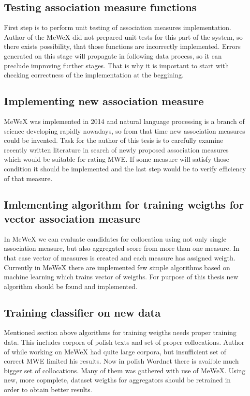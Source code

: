 \subsection{Testing association measure functions}
First step is to perform unit testing of association measures implementation. Author of the MeWeX did not prepared unit tests for this part of the system, 
so there exists possibility, that those functions are incorrectly implemented. Errors generated on this stage will propagate in following data process, 
so it can preclude improving further stages. That is why it is important to start with checking correctness of the implementation 
at the beggining.

\subsection{Implementing new association measure}
MeWeX was implemented in 2014 and natural language processing is a branch of science developing rapidly nowadays, 
so from that time new association measures could be invented. Task for the author of this tesis is to carefully examine recently written literature 
in search of newly proposed association measures which would be suitable for rating MWE. If some measure will satisfy those condition it should 
be implemented and the last step would be to verify efficiency of that measure.

\subsection{Imlementing algorithm for training weigths for vector association measure}
In MeWeX we can evaluate candidates for collocation using not only single association measure, but also aggregated score from more than one measure. 
In that case vector of measures is created and each measure has assigned weigth. Currently in MeWeX there are implemented few simple algorithms 
based on machine learning which trains vector of weigths. For purpose of this thesis new algorithm should be found and implemented.

\subsection{Training classifier on new data}
Mentioned section above algorithms for training weigths needs proper training data. This includes corpora of polish texts and set 
of proper collocations. Author of \cite{mgr} while working on MeWeX had quite large corpora, but insufficient set of correct MWE limited his results. 
Now in polish Wordnet there is availble much bigger set of collocations. Many of them was gathered with use of MeWeX.
Using new, more copmplete, dataset weigths for aggregators should be retrained in order to obtain better results.


